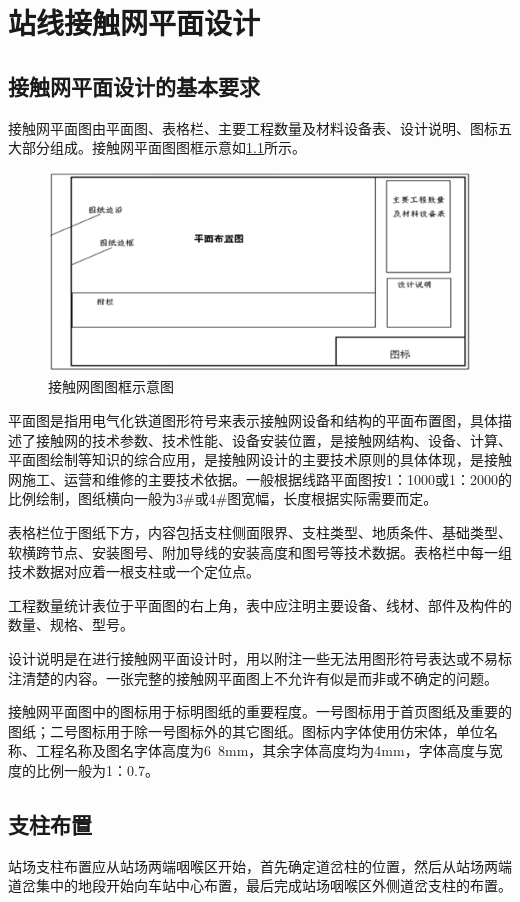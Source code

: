 \chapter{站线接触网平面设计}

\section{接触网平面设计的基本要求}
接触网平面图由平面图、表格栏、主要工程数量及材料设备表、设计说明、图标五大部分组成。接触网平面图图框示意如\ref{fig:接触网图图框示意图}所示。
\begin{figure}[H]
	\centering
	\includegraphics[width=0.7\linewidth]{figures/接触网图图框示意图}
	\caption{接触网图图框示意图}
	\label{fig:接触网图图框示意图}
\end{figure}
平面图是指用电气化铁道图形符号来表示接触网设备和结构的平面布置图，具体描述了接触网的技术参数、技术性能、设备安装位置，是接触网结构、设备、计算、平面图绘制等知识的综合应用，是接触网设计的主要技术原则的具体体现，是接触网施工、运营和维修的主要技术依据。一般根据线路平面图按1：1000或1：2000的比例绘制，图纸横向一般为3\#或4\#图宽幅，长度根据实际需要而定。

表格栏位于图纸下方，内容包括支柱侧面限界、支柱类型、地质条件、基础类型、软横跨节点、安装图号、附加导线的安装高度和图号等技术数据。表格栏中每一组技术数据对应着一根支柱或一个定位点。

工程数量统计表位于平面图的右上角，表中应注明主要设备、线材、部件及构件的数量、规格、型号。

设计说明是在进行接触网平面设计时，用以附注一些无法用图形符号表达或不易标注清楚的内容。一张完整的接触网平面图上不允许有似是而非或不确定的问题。

接触网平面图中的图标用于标明图纸的重要程度。一号图标用于首页图纸及重要的图纸；二号图标用于除一号图标外的其它图纸。图标内字体使用仿宋体，单位名称、工程名称及图名字体高度为6~8mm，其余字体高度均为4mm，字体高度与宽度的比例一般为1：0.7。

\section{支柱布置}
站场支柱布置应从站场两端咽喉区开始，首先确定道岔柱的位置，然后从站场两端道岔集中的地段开始向车站中心布置，最后完成站场咽喉区外侧道岔支柱的布置。

